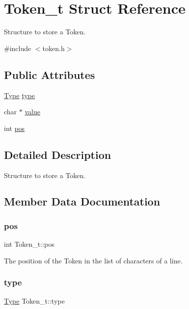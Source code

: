 \hypertarget{structToken__t}{}\section{Token\+\_\+t Struct Reference}
\label{structToken__t}


Structure to store a Token.  




{\ttfamily \#include $<$token.\+h$>$}

\subsection*{Public Attributes}
\begin{DoxyCompactItemize}
\item 
\hyperlink{token_8h_a16a6868f96564b3446a7f86b122b253e}{Type} \hyperlink{structToken__t_a7d98c18605736b172ab850e2ae6e8dc3}{type}
\item 
char $\ast$ \hyperlink{structToken__t_ab1fc0d2fffac8698ff813b530c326979}{value}
\item 
int \hyperlink{structToken__t_afaa6bb48514d5946cd2f2434e86cd7ce}{pos}
\end{DoxyCompactItemize}


\subsection{Detailed Description}
Structure to store a Token. 

\subsection{Member Data Documentation}
\mbox{\label{structToken__t_afaa6bb48514d5946cd2f2434e86cd7ce}} 
\subsubsection{\texorpdfstring{pos}{pos}}
{\footnotesize\ttfamily int Token\+\_\+t\+::pos}

The position of the Token in the list of characters of a line. \mbox{\label{structToken__t_a7d98c18605736b172ab850e2ae6e8dc3}} 
\subsubsection{\texorpdfstring{type}{type}}
{\footnotesize\ttfamily \hyperlink{token_8h_a16a6868f96564b3446a7f86b122b253e}{Type} Token\+\_\+t\+::type}

